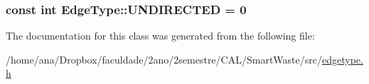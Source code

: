 \subsubsection[{\texorpdfstring{U\+N\+D\+I\+R\+E\+C\+T\+ED}{UNDIRECTED}}]{\setlength{\rightskip}{0pt plus 5cm}const int Edge\+Type\+::\+U\+N\+D\+I\+R\+E\+C\+T\+ED = 0\hspace{0.3cm}{\ttfamily [static]}}\hypertarget{classEdgeType_a6533cc56d05c288a550b9980b66c9317}{}\label{classEdgeType_a6533cc56d05c288a550b9980b66c9317}


The documentation for this class was generated from the following file\+:\begin{DoxyCompactItemize}
\item 
/home/ana/\+Dropbox/faculdade/2ano/2semestre/\+C\+A\+L/\+Smart\+Waste/src/\hyperlink{edgetype_8h}{edgetype.\+h}\end{DoxyCompactItemize}
